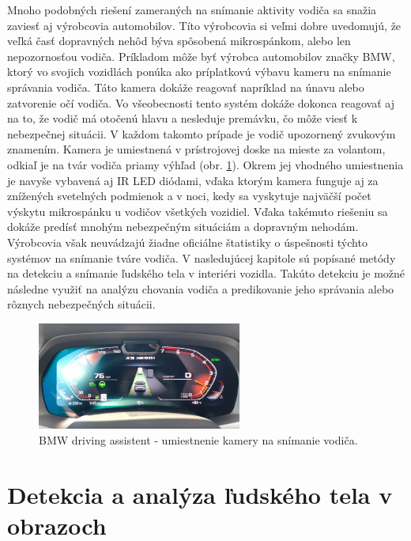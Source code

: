 \documentclass[slovak,master,dept460,male,cpp,cpdeclaration]{diploma}
\begin{document}
Mnoho podobných riešení zameraných na snímanie aktivity vodiča sa snažia zaviesť aj výrobcovia automobilov. Títo výrobcovia si veľmi dobre uvedomujú, že veľká časť dopravných nehôd býva spôsobená mikrospánkom, alebo len nepozornosťou vodiča. Príkladom môže byť výrobca automobilov značky BMW, ktorý vo svojich vozidlách ponúka ako príplatkovú výbavu kameru na snímanie správania vodiča. Táto kamera dokáže reagovať napríklad na únavu alebo zatvorenie očí vodiča. Vo všeobecnosti tento systém dokáže dokonca reagovať aj na to, že vodič má otočenú hlavu a nesleduje premávku, čo môže viesť k nebezpečnej situácii. V každom takomto prípade je vodič upozornený zvukovým znamením. Kamera je umiestnená v prístrojovej doske na mieste za volantom, odkiaľ je na tvár vodiča priamy výhľad (obr. \ref{fig:bmwAssistent}). Okrem jej vhodného umiestnenia je navyše vybavená aj IR LED diódami, vďaka ktorým kamera funguje aj za znížených svetelných podmienok a v noci, kedy sa vyskytuje najväčší počet výskytu mikrospánku u vodičov všetkých vozidiel. Vďaka takémuto riešeniu sa dokáže predísť mnohým nebezpečným situáciám a dopravným nehodám. Výrobcovia však neuvádzajú žiadne oficiálne štatistiky o úspešnosti týchto systémov na snímanie tváre vodiča. V nasledujúcej kapitole sú popísané metódy na detekciu a snímanie ľudského tela  v interiéri vozidla. Takúto detekciu je možné následne využiť na analýzu chovania vodiča  a predikovanie jeho správania alebo rôznych nebezpečných situácii.

\begin{figure}[H]
	\centering
	\includegraphics[width=0.6\textwidth]{Figures/bmw.jpg}
	\caption{BMW driving assistent - umiestnenie kamery na snímanie vodiča.\cite{bmw2019assistent}}
	\label{fig:bmwAssistent}
\end{figure}

\newpage
\section{Detekcia a analýza ľudského tela v obrazoch}
\label{sec:human body decection}
\end{document}
